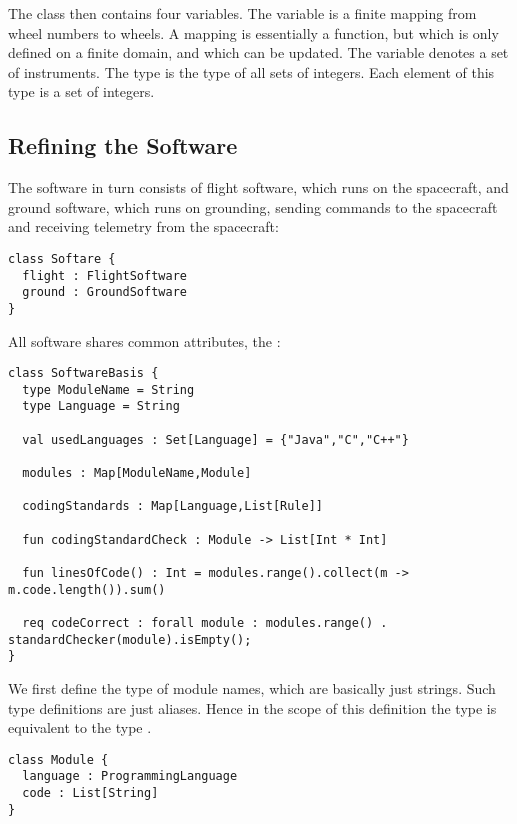The class then contains four variables.
%
The variable  is a finite mapping from wheel numbers to wheels. A mapping is essentially a function, 
but which is only defined on a finite domain, and which
can be updated.
%
The variable  denotes a set of instruments.
The type  is the type of all sets of integers. Each element of this type is a set of integers.
%

\subsection{Refining the Software}

The software in turn consists of flight software, which
runs on the spacecraft, and ground software, which runs
on grounding, sending commands to the spacecraft and receiving telemetry from the spacecraft:

\sk
\begin{lstlisting}
class Softare {
  flight : FlightSoftware
  ground : GroundSoftware
}
\end{lstlisting}

\noindent
All software shares common attributes, the :

\sk
\begin{lstlisting}
class SoftwareBasis {
  type ModuleName = String
  type Language = String

  val usedLanguages : Set[Language] = {"Java","C","C++"}

  modules : Map[ModuleName,Module]

  codingStandards : Map[Language,List[Rule]]

  fun codingStandardCheck : Module -> List[Int * Int]

  fun linesOfCode() : Int = modules.range().collect(m -> m.code.length()).sum()

  req codeCorrect : forall module : modules.range() . standardChecker(module).isEmpty();
}
\end{lstlisting}

\noindent
We first define the type of  
module names, which are basically just strings. Such
type definitions are just aliases. Hence in the scope
of this definition the type  is equivalent to the type .

\sk
\begin{lstlisting}
class Module {
  language : ProgrammingLanguage
  code : List[String]
}
\end{lstlisting}

